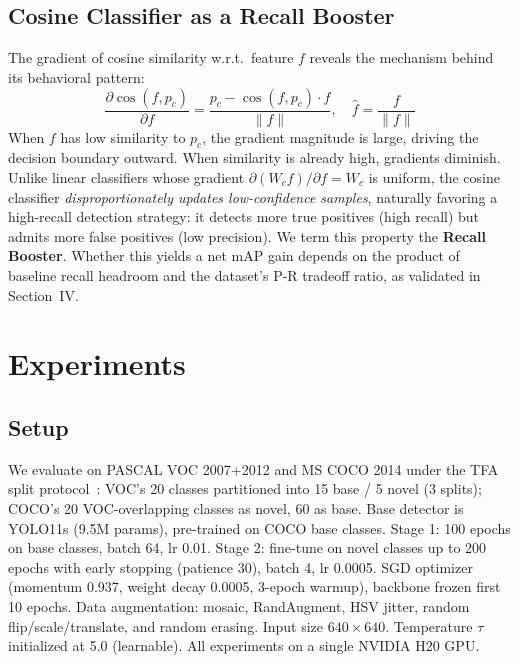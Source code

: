 \documentclass[conference]{IEEEtran}
\begin{document}
\subsection{Cosine Classifier as a Recall Booster}

The gradient of cosine similarity w.r.t.\ feature $f$ reveals the mechanism behind its behavioral pattern:
\begin{equation}
\frac{\partial \cos(f, p_c)}{\partial f} = \frac{p_c - \cos(f, p_c) \cdot \hat{f}}{\|f\|}, \quad \hat{f} = \frac{f}{\|f\|}
\label{eq:gradient}
\end{equation}
When $f$ has low similarity to $p_c$, the gradient magnitude is large, driving the decision boundary outward. When similarity is already high, gradients diminish. Unlike linear classifiers whose gradient $\partial(W_c f)/\partial f = W_c$ is uniform, the cosine classifier \textit{disproportionately updates low-confidence samples}, naturally favoring a high-recall detection strategy: it detects more true positives (high recall) but admits more false positives (low precision). We term this property the \textbf{Recall Booster}. Whether this yields a net mAP gain depends on the product of baseline recall headroom and the dataset's P-R tradeoff ratio, as validated in Section~IV.

\section{Experiments}

\subsection{Setup}

We evaluate on PASCAL VOC 2007+2012 and MS COCO 2014 under the TFA split protocol~\cite{wang2020tfa}: VOC's 20 classes partitioned into 15 base / 5 novel (3 splits); COCO's 20 VOC-overlapping classes as novel, 60 as base. Base detector is YOLO11s (9.5M params), pre-trained on COCO base classes. Stage 1: 100 epochs on base classes, batch 64, lr 0.01. Stage 2: fine-tune on novel classes up to 200 epochs with early stopping (patience 30), batch 4, lr 0.0005. SGD optimizer (momentum 0.937, weight decay 0.0005, 3-epoch warmup), backbone frozen first 10 epochs. Data augmentation: mosaic, RandAugment, HSV jitter, random flip/scale/translate, and random erasing. Input size $640\times640$. Temperature $\tau$ initialized at 5.0 (learnable). All experiments on a single NVIDIA H20 GPU.
\end{document}
